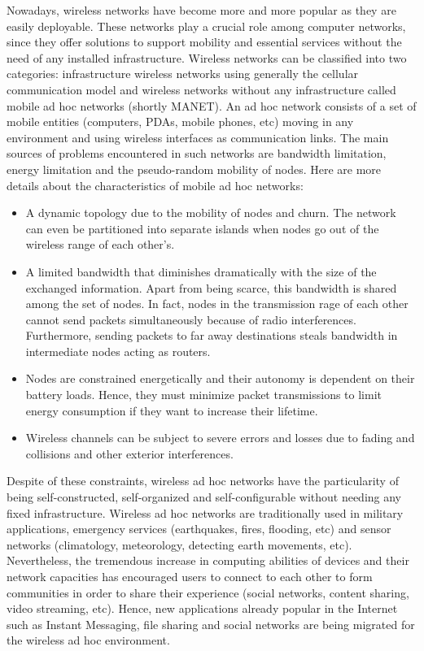 Nowadays, wireless networks have become more and more popular as they are easily deployable. These networks play a crucial role among computer networks, since they offer solutions to support mobility and essential services without the need of any installed infrastructure. Wireless networks can be classified into two categories: infrastructure wireless networks using generally the cellular communication model and wireless networks without any infrastructure called mobile ad hoc networks (shortly MANET). An ad hoc network consists of a set of mobile entities (computers, PDAs, mobile phones, etc) moving in any environment and using wireless interfaces as communication links. The main sources of problems encountered in such networks are bandwidth limitation, energy limitation and the pseudo-random mobility of nodes. Here are more details about the characteristics of mobile ad hoc networks:
\begin{itemize}
\item{A dynamic topology due to the mobility of nodes and churn. The network can even be partitioned into separate islands when nodes go out of the wireless range of each other's.}
\item{A limited bandwidth that diminishes dramatically with the size of the exchanged information. Apart from being scarce, this bandwidth is shared among the set of nodes. In fact, nodes in the transmission rage of each other cannot send packets simultaneously because of radio interferences.  Furthermore, sending packets to far away destinations steals bandwidth in intermediate nodes acting as routers.} 
\item{Nodes are constrained energetically and their autonomy is dependent on their battery loads. Hence, they must minimize packet transmissions to limit energy consumption if they want to increase their lifetime.}
\item{Wireless channels can be subject to severe errors and losses due to fading and collisions and other exterior interferences.}
\end{itemize}

Despite of these constraints, wireless ad hoc networks have the particularity of being self-constructed, self-organized and self-configurable without needing any fixed infrastructure. Wireless ad hoc networks are traditionally used in military applications, emergency services (earthquakes, fires, flooding, etc) and sensor networks (climatology, meteorology, detecting earth movements, etc). Nevertheless, the tremendous increase in computing abilities of devices and their network capacities has encouraged users to connect to each other to form communities in order to share their experience (social networks, content sharing, video streaming, etc). Hence, new applications already popular in the Internet such as Instant Messaging, file sharing and social networks are being migrated for the wireless ad hoc environment.

